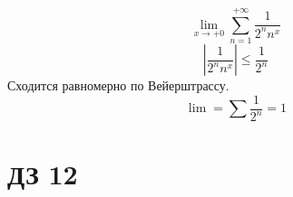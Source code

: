 \begin{exercise}[2808]
    \[\lim_{x \to +0} \sum_{n = 1}^{+\infty} \frac{1}{2^n n^x}\]
    \[\left|\frac{1}{2^n n^x}\right| \leq \frac{1}{2^n}\]
    Сходится равномерно по Вейерштрассу.
    \[\lim = \sum \frac{1}{2^n} = 1\]
\end{exercise}

\section*{ДЗ 12}



